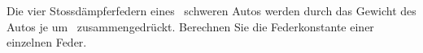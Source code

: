 Die vier Stossdämpferfedern eines \mAuO\ schweren Autos werden durch das Gewicht des Autos je um \xStO\ zusammengedrückt. Berechnen Sie die Federkonstante einer einzelnen Feder.
